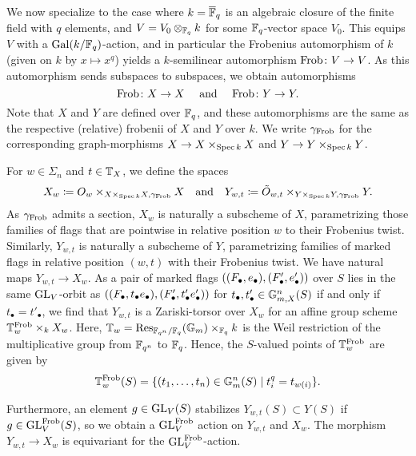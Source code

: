 \documentclass[../main.tex]{subfiles}
\begin{document}
We now specialize to the case where $k = \overline {\mathbb{F}}_q$ is an algebraic closure of 
the finite field with $q$ elements, and $V = V_0 \otimes_{\mathbb{F}_q} k$ for 
some $\mathbb{F}_q$-vector space $V_0$. 
This equips $V$ with a $\operatorname{Gal}(k/\mathbb{F}_q)$-action, and in particular the Frobenius
automorphism of $k$ (given on $k$ by $x\mapsto x^q$) yields a $k$-semilinear
automorphism $\mathrm{Frob}\colon  V \to V$. As this automorphism sends subspaces to
subspaces, we obtain automorphisms 
\begin{equation*}
  \mathrm{Frob}\colon  X \to X \quad \text{ and } \quad \mathrm{Frob}\colon  Y \to Y.
\end{equation*}
Note that $X$ and $Y$ are defined over $\mathbb{F}_q$, and these automorphisms are 
the same as the respective (relative) frobenii of $X$ and $Y$ over $k$. We write
$\gamma_{\mathrm{Frob}}$ for the corresponding graph-morphisms $X \to X \times_{\operatorname{Spec} k} X$ and 
$Y \to Y\times_{\operatorname{Spec} k} Y$.

For $w \in \Sigma_n$ and $t \in \mathbb{T}_X$, we define the spaces
\begin{equation}\label{eq:defXYsigma}
  X_w \coloneqq O_w \times_{X \times_{\operatorname{Spec} k}X, \gamma_{\mathrm{Frob}}} X
  \quad \text{and} \quad
  Y_{w,t} \coloneqq \tilde O_{w,t} \times_{Y \times_{\operatorname{Spec} k}Y,
  \gamma_{\mathrm{Frob}}} Y.
\end{equation}
As $\gamma_{\mathrm{Frob}}$ admits a section, $X_w$ is naturally a subscheme of $X$,
parametrizing those families of flags that are pointwise in relative position
$w$ to their Frobenius twist. Similarly, $Y_{w, t}$ is naturally a subscheme of $Y$,
parametrizing families of marked flags in relative position $(w,t)$ with their
Frobenius twist. 
We have natural maps $Y_{w, t} \to X_w$. 
As a pair of marked flags $((F_\bullet, e_\bullet), (F_\bullet', e_\bullet'))$ over $S$
lies in the same $\operatorname{GL}_V$-orbit as $((F_\bullet, t_\bullet e_\bullet), (F_\bullet', t'_\bullet
e_\bullet'))$ for $t_\bullet, t'_\bullet \in \mathbb{G}_{m,X}^n(S)$ if and only if 
$t_\bullet = t'_\bullet$, we find that $Y_{w,t}$ is a
Zariski-torsor over $X_w$ for an affine group scheme $\mathbb{T}_w^{\mathrm{Frob}} \times_k
X_w$. Here, $\mathbb{T}_w = \mathrm{Res}_{\mathbb{F}_{q^n}/\mathbb{F}_{q}}(\mathbb{G}_m) \times_{\mathbb{F}_q} k$ is the
Weil restriction of the multiplicative group from $\mathbb{F}_{q^n}$ to $\mathbb{F}_q$. 
Hence, the $S$-valued points of $\mathbb{T}_w^{\mathrm{Frob}}$ are given by
\begin{equation*}
  \mathbb{T}_{w}^{\mathrm{Frob}}(S) = \{(t_1, \dots, t_n) \in \mathbb{G}_{m}^n(S) \mid 
    t_i^q = t_{w(i)}\}.
\end{equation*}

Furthermore, an element $g \in \operatorname{GL}_V(S)$ stabilizes $Y_{w,t}(S) \subset Y(S)$ if
$g \in \operatorname{GL}_V^{\mathrm{Frob}}(S)$, so we obtain a $\operatorname{GL}_V^{\mathrm{Frob}}$ action on $Y_{w,t}$ and 
$X_w$. The morphism $Y_{w,t} \to X_w$ is equivariant for the $\operatorname{GL}_V^{\mathrm{Frob}}$-action.
\end{document}
